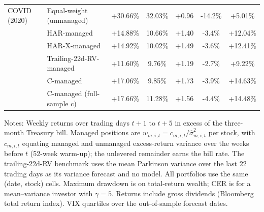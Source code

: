 \begin{table}[htbp]
\begin{tabular}{llccccc}
\midrule
COVID (2020) & Equal-weight (unmanaged) & +30.66\% & 32.03\% & +0.96 & -14.2\% & +5.01\% \\
 & HAR-managed & +14.88\% & 10.66\% & +1.40 & -3.4\% & +12.04\% \\
 & HAR-X-managed & +14.92\% & 10.02\% & +1.49 & -3.6\% & +12.41\% \\
 & Trailing-22d-RV-managed & +11.60\% & 9.76\% & +1.19 & -2.7\% & +9.22\% \\
 & C-managed & +17.06\% & 9.85\% & +1.73 & -3.9\% & +14.63\% \\
 & C-managed (full-sample c) & +17.66\% & 11.28\% & +1.56 & -4.4\% & +14.48\% \\
\midrule
\bottomrule
\end{tabular}
\begin{tablenotes}\small
\item Notes: Weekly returns over trading days $t+1$ to $t+5$ in excess of the three-month Treasury bill. Managed positions are $w_{m,i,t} = c_{m,i,t}/\hat\sigma^2_{m,i,t}$ per stock, with $c_{m,i,t}$ equating managed and unmanaged excess-return variance over the weeks before $t$ (52-week warm-up); the unlevered remainder earns the bill rate. The trailing-22d-RV benchmark uses the mean Parkinson variance over the last 22 trading days as its variance forecast and no model. All portfolios use the same (date, stock) cells. Maximum drawdown is on total-return wealth; CER is for a mean--variance investor with $\gamma=5$. Returns include gross dividends (Bloomberg total return index). VIX quartiles over the out-of-sample forecast dates.
\end{tablenotes}
\end{table}
